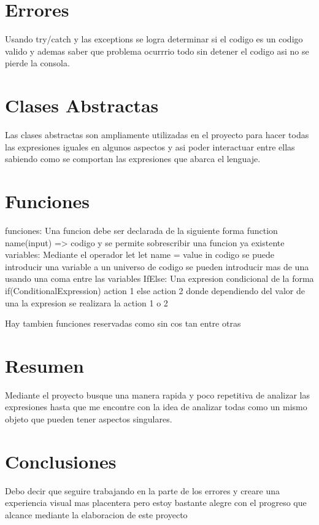 \documentclass{article}
\begin{document}
\newpage 
\section*{Errores}
Usando try/catch y las exceptions se logra determinar si el codigo es un codigo valido y ademas saber que problema ocurrrio todo sin detener el codigo asi no se pierde la consola.

\newpage 
\section*{Clases Abstractas}
Las clases abstractas son ampliamente utilizadas en el proyecto para hacer todas las expresiones iguales en algunos aspectos y asi poder interactuar entre ellas sabiendo como se comportan las expresiones que abarca el lenguaje.

\newpage 
\section*{Funciones}
funciones:
Una funcion debe ser declarada de la siguiente forma 
function name(input) => codigo
y se permite sobrescribir una funcion ya existente
variables:
Mediante el operador let
let name = value in codigo
se puede introducir una variable a un universo de codigo
se pueden introducir mas de una usando una coma entre las variables
IfElse:
Una expresion condicional de la forma
if(ConditionalExpression) action 1 else action 2
donde dependiendo del valor de una la expresion se realizara la action 1 o 2

Hay tambien funciones reservadas como sin cos tan entre otras

\newpage
\section*{Resumen}
Mediante el proyecto busque una manera rapida y poco repetitiva de analizar las expresiones hasta que me encontre con la idea de analizar todas como un mismo objeto que pueden tener aspectos singulares.

\newpage 
\section*{Conclusiones}
Debo decir que seguire trabajando en la parte de los errores y creare una experiencia visual mas placentera pero estoy bastante alegre con el progreso que alcance mediante la elaboracion de este proyecto
\end{document}
